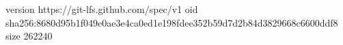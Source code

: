 version https://git-lfs.github.com/spec/v1
oid sha256:8680d95b1f049e0ae3e4ca0ed1e198fdee352b59d7d2b84d3829668c6600ddf8
size 262240
